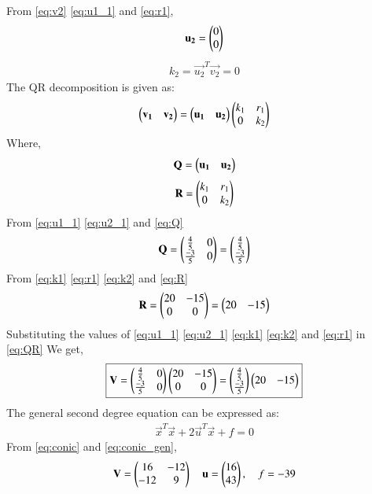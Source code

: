 \documentclass[journal,12pt,twocolumn]{IEEEtran}
\begin{document}
From \eqref{eq:v2} \eqref{eq:u1_1}  and \eqref{eq:r1},
\begin{align}
\mathbf{u_2}=\begin{pmatrix}0 \\ 0\end{pmatrix} \label{eq:u2_1}
\end{align}
\begin{align}
 k_2=\vec{u_2}^T\vec{v_2}=0  \label{eq:k2}
\end{align}
The QR decomposition is given as:
\begin{align}
\begin{pmatrix}\mathbf{v_1}\quad \mathbf{v_2}\end{pmatrix}=\begin{pmatrix}\mathbf{u_1}\quad \mathbf{u_2}\end{pmatrix} \begin{pmatrix}k_1 & r_1 \\ 0 & k_2\end{pmatrix} \label{eq:QR}
\end{align}
Where,
\begin{align}
 \mathbf{Q}=\begin{pmatrix}\mathbf{u_1}\quad\mathbf{u_2}\end{pmatrix}  \label{eq:Q}
\end{align}
\begin{align}
 \mathbf{R}=\begin{pmatrix}k_1 & r_1 \\ 0 & k_2\end{pmatrix}  \label{eq:R}
\end{align}
From \eqref{eq:u1_1} \eqref{eq:u2_1} and \eqref{eq:Q}
\begin{align}
 \mathbf{Q}=\begin{pmatrix}\frac{4}{5}& 0 \\ \frac{-3}{5}& 0\end{pmatrix}=\begin{pmatrix}\frac{4}{5}\\ \frac{-3}{5}\end{pmatrix}  \label{eq:Q_1}
\end{align}
From \eqref{eq:k1} \eqref{eq:r1} \eqref{eq:k2} and \eqref{eq:R}
\begin{align}
 \mathbf{R}=\begin{pmatrix}20 & -15 \\ 0 & 0\end{pmatrix}=\begin{pmatrix}20 & -15\end{pmatrix}  \label{eq:R_1}
\end{align}
Substituting the values of \eqref{eq:u1_1} \eqref{eq:u2_1} \eqref{eq:k1} \eqref{eq:k2} and \eqref{eq:r1} in \eqref{eq:QR} 
We get,
\begin{align}
 \boxed{\mathbf{V}=\begin{pmatrix}\frac{4}{5} & 0 \\ \frac{-3}{5} & 0\end{pmatrix} \begin{pmatrix}20 & -15 \\ 0 & 0\end{pmatrix}=\begin{pmatrix}\frac{4}{5}\\ \frac{-3}{5}\end{pmatrix}\begin{pmatrix}20 & -15\end{pmatrix}}  \label{eq:V=QR}
\end{align}
The general second degree equation can be expressed as:
\begin{align}
\vec{x}^T\vec{x}+2\vec{u}^T\vec{x}+f=0 \label{eq:conic_gen}
\end{align}
From \eqref{eq:conic} and \eqref{eq:conic_gen},
\begin{align}
\mathbf{V}=\begin{pmatrix}16 & -12 \\ -12 & 9 \end{pmatrix} \quad\mathbf{u}=\begin{pmatrix}16 \\ 43\end{pmatrix},\quad f=-39 \label{eq:parametrics}
\end{align}
\end{document}
